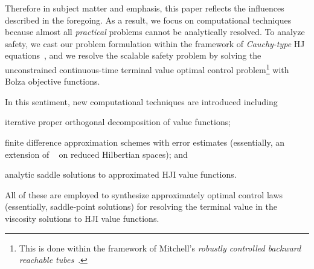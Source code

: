 Therefore in subject matter and emphasis, this paper reflects the influences described in the foregoing. As a result, we focus on computational techniques because almost all \textit{practical} problems cannot be analytically resolved. To analyze safety, we cast our problem formulation within the framework of \textit{Cauchy-type} HJ equations~\cite{Crandall1983viscosity}, and we resolve the scalable safety problem by solving the unconstrained continuous-time terminal value optimal control problem\footnote{This is done within the framework of Mitchell's \textit{robustly controlled backward reachable tubes}~\cite{Mitchell2020}.} with Bolza objective functions.  %

In this sentiment, new computational techniques are introduced including
%
\begin{inparaenum}[(i)]
	\item iterative proper orthogonal decomposition of  value functions;
	\item finite difference approximation schemes with error estimates (essentially, an extension of ~\cite{Crandall1984} on reduced Hilbertian spaces); and
	\item  analytic saddle solutions to approximated HJI value functions.
\end{inparaenum} 
%
All of these are employed to synthesize approximately optimal control laws (essentially, saddle-point solutions)  for resolving the terminal value in the viscosity solutions to HJI value functions.



